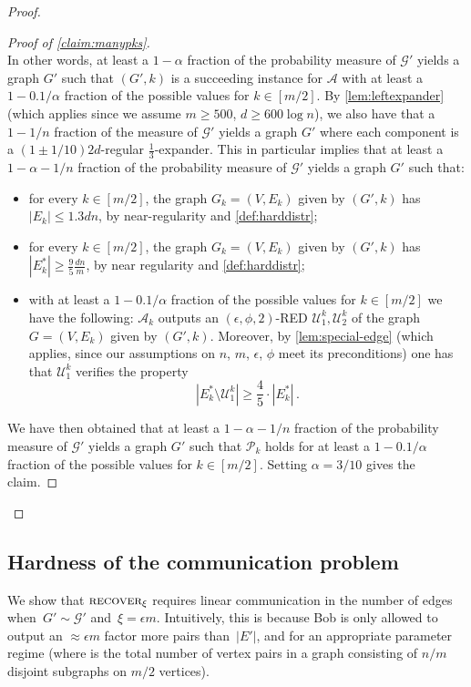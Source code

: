 \documentclass[epsfig,letter,11pt]{article}
\numberwithin{equation}{section}
\DeclareMathOperator*{\recover}{\textsc{recover}}
\begin{document}
\begin{proof}
\begin{proof}[Proof of \cref{claim:manypks}]
\begin{equation*}
		\end{equation*}
		In other words, at least a $1-\alpha$ fraction of the probability measure of $\mathcal{G}'$ yields a graph $G'$ such that $(G',k)$ is a succeeding instance for $\mathcal{A}$ with at least a $1-0.1/\alpha$ fraction of the possible values for $k \in [m/2]$. By \cref{lem:leftexpander} (which applies since we assume $m\ge 500$, $d \ge 600 \log n$), we also have that a $1-1/n$ fraction of the measure of $\mathcal{G}'$ yields a graph $G'$ where each component is a $(1 \pm 1/10)2d$-regular $\frac{1}{3}$-expander. This in particular implies that at least a $1-\alpha-1/n$ fraction of the probability measure of $\mathcal{G}'$ yields a graph $G'$ such that:
		\begin{itemize}
			\item for every $k \in [m/2]$, the graph $G_k=(V,E_k)$ given by $(G',k)$ has $|E_k| \le 1.3 dn$, by near-regularity and \cref{def:harddistr};
			\item for every $k \in [m/2]$, the graph $G_k=(V,E_k)$ given by $(G',k)$ has $|E^*_k| \ge \frac{9}{5} \frac{dn}{m}$, by near regularity and \cref{def:harddistr};
			\item with at least a $1-0.1/\alpha$ fraction of the possible values for $k \in [m/2]$ we have the following: $\mathcal{A}_k$ outputs an $(\epsilon,\phi,2)$-RED $\mathcal{U}^k_1,\mathcal{U}^k_2$ of the graph $G=(V,E_k)$ given by $(G',k)$. Moreover, by \cref{lem:special-edge} (which applies, since our assumptions on $n$, $m$, $\epsilon$, $\phi$ meet its preconditions) one has that $\mathcal{U}_1^k$ verifies the property
			\begin{equation*}
				\left| E^*_k \setminus \mathcal{U}^k_1\right| \ge \frac{4}{5} \cdot \left|E^*_k\right|  \, .
			\end{equation*}
		\end{itemize}
		We have then obtained that at least a $1-\alpha-1/n$ fraction of the probability measure of $\mathcal{G}'$ yields a graph $G'$ such that $\mathcal{P}_k$ holds for at least a $1-0.1/\alpha$ fraction of the possible values for $k \in [m/2]$. Setting $\alpha = 3/10$ gives the claim.
	\end{proof}
\end{proof}

\subsection{Hardness of the communication problem}
\label{subsec:hardcomm}
We show that $\recover_{\xi}$ requires linear communication in the number of edges when~$G' \sim \mathcal{G}'$ and~$\xi = \epsilon m$. Intuitively, this is because Bob is only allowed to output an $\approx \epsilon m$ factor more pairs than~$|E'|$, and for an appropriate parameter regime  (where  is the total number of vertex pairs in a graph consisting of $n/m$ disjoint subgraphs on $m/2$ vertices).
\end{document}
